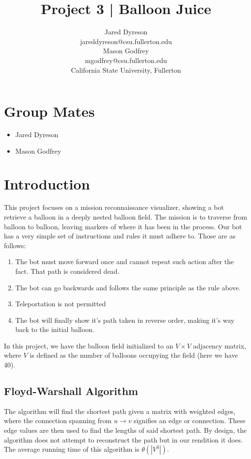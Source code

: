 \documentclass{article}
\title{Project 3 | Balloon Juice}
\author{Jared Dyreson \\
        jareddyreson@csu.fullerton.edu \\
        Mason Godfrey \\
        mgodfrey@csu.fullerton.edu \\
        California State University, Fullerton}
\date
\begin{document}
\maketitle
\tableofcontents

\newpage

\section{Group Mates}

\begin{itemize}
\item Jared Dyreson
\item Mason Godfrey
\end{itemize}

\section{Introduction}

This project focuses on a mission reconnaissance visualizer, showing a bot retrieve a balloon in a deeply nested balloon field.
The mission is to traverse from balloon to balloon, leaving markers of where it has been in the process.
Our bot has a very simple set of instructions and rules it must adhere to.
Those are as follows:

\begin{enumerate}
\item The bot must move forward once and cannot repeat such action after the fact. That path is considered dead.
\item The bot can go backwards and follows the same principle as the rule above.
\item Teleportation is not permitted
\item The bot will finally show it's path taken in reverse order, making it's way back to the initial balloon.
\end{enumerate}

\begin{flushleft}
In this project, we have the balloon field initialized to an $V \times V$ adjacency matrix, where $V$ is defined as the number of balloons occupying the field (here we have 40).
\end{flushleft}

\subsection{Floyd-Warshall Algorithm}

The algorithm will find the shortest path given a matrix with weighted edges, where the connection spanning from $u \rightarrow v$ signifies an edge or connection.
These edge values are then used to find the lengths of said shortest path.
By design, the algorithm does not attempt to reconstruct the path but in our rendition it does.
The average running time of this algorithm is $\theta(|V^3|)$.
\end{document}
